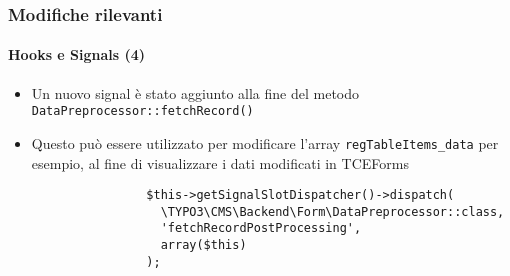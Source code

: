 
\begin{frame}[fragile]
	\frametitle{Modifiche rilevanti}
	\framesubtitle{Hooks e Signals (4)}

	\begin{itemize}

		\item Un nuovo signal è stato aggiunto alla fine del metodo \texttt{DataPreprocessor::fetchRecord()}
		\item Questo può essere utilizzato per modificare l'array \texttt{regTableItems\_data} per esempio,
			al fine di visualizzare i dati modificati in TCEForms

			\begin{lstlisting}
				$this->getSignalSlotDispatcher()->dispatch(
				  \TYPO3\CMS\Backend\Form\DataPreprocessor::class,
				  'fetchRecordPostProcessing',
				  array($this)
				);
			\end{lstlisting}

	\end{itemize}

\end{frame}


